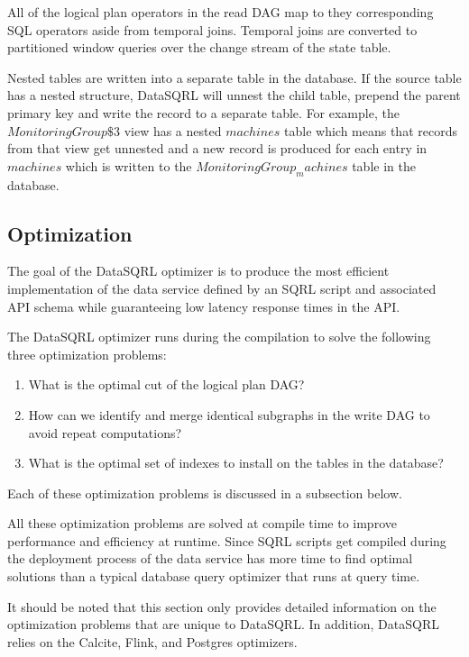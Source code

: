 \documentclass[	DIV=calc,%
							paper=letter,%
							fontsize=11pt,%
							twocolumn]{scrartcl}	 					%
\begin{document}
All of the logical plan operators in the read DAG map to they corresponding SQL operators aside from temporal joins. Temporal joins are converted to partitioned window queries over the change stream of the state table.

Nested tables are written into a separate table in the database. If the source table has a nested structure, DataSQRL will unnest the child table, prepend the parent primary key and write the record to a separate table. For example, the $MonitoringGroup\$3$ view has a nested $machines$ table which means that records from that view get unnested and a new record is produced for each entry in $machines$ which is written to the $MonitoringGroup_machines$ table in the database.

\subsection{Optimization}
\label{sec:optimization}

The goal of the DataSQRL optimizer is to produce the most efficient implementation of the data service defined by an SQRL script and associated API schema while guaranteeing low latency response times in the API.

The DataSQRL optimizer runs during the compilation to solve the following three optimization problems:
\begin{enumerate}
    \item What is the optimal cut of the logical plan DAG?
    \item How can we identify and merge identical subgraphs in the write DAG to avoid repeat computations?
    \item What is the optimal set of indexes to install on the tables in the database?
\end{enumerate}

Each of these optimization problems is discussed in a subsection below.

All these optimization problems are solved at compile time to improve performance and efficiency at runtime. Since SQRL scripts get compiled during the deployment process of the data service has more time to find optimal solutions than a typical database query optimizer that runs at query time.

It should be noted that this section only provides detailed information on the optimization problems that are unique to DataSQRL. In addition, DataSQRL relies on the Calcite, Flink, and Postgres optimizers.
\end{document}

